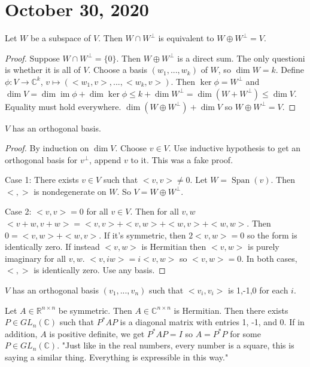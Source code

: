 \documentclass{article}
\newcommand{\C}{\mathbb{C}}
\newcommand{\R}{\mathbb{R}}
\newcommand{\ra}[1][]{\xrightarrow{#1}}
\DeclareMathOperator{\im}{im}
\DeclareMathOperator{\Span}{Span}
\begin{document}
\section{October 30, 2020}
\begin{theorem}
Let $W$ be a subspace of $V$. Then $W\cap W^\perp$ is equivalent to $W\oplus W^\perp=V$.
\end{theorem}
\begin{proof}
Suppose $W\cap W^\perp=\{0\}$. Then $W\oplus W^\perp$ is a direct sum. The only questioni is whether it is all of $V$. Choose a basis $(w_1,...,w_k)$ of $W$, so $\dim W=k$. Define $\phi:V\ra \C^k$, $v\mapsto (<w_1,v>,...,<w_k,v>)$. Then $\ker\phi=W^\perp$ and $\dim V=\dim\im\phi+\dim\ker\phi\leq k+\dim W^\perp =\dim (W+W^\perp)\leq \dim V$. Equality must hold everywhere. $\dim(W\oplus W^\perp)+\dim V$ so $W\oplus W^\perp=V$.
\end{proof}
\begin{theorem}
$V$ has an orthogonal basis.
\end{theorem}
\begin{proof}
By induction on $\dim V$. Choose $v\in V$. Use inductive hypothesis to get an orthogonal basis for $v^\perp$, append $v$ to it. This was a fake proof.

Case 1: There exists $v\in V$ such that $<v,v>\neq 0$. Let $W=\Span(v)$. Then $<,>$ is nondegenerate on $W$. So $V=W\oplus W^\perp$.

Case 2: $<v,v>=0$ for all $v\in V$. Then for all $v,w$ $<v+w,v+w>=<v,v>+<v,w>+<w,v>+<w,w>$. Then $0=<v,w>+<w,v>$. If it's symmetric, then $2<v,w>=0$ so the form is identically zero. If instead $<v,w>$ is Hermitian then $<v,w>$ is purely imaginary for all $v,w$. $<v,iw>=i<v,w>$ so $<v,w>=0$. In both cases, $<,>$ is identically zero. Use any basis.
\end{proof}
\begin{corollary}
$V$ has an orthogonal basis $(v_1,...,v_n)$ such that $<v_i,v_i>$ is 1,-1,0 for each $i$.
\end{corollary}
\begin{corollary}
Let $A\in \R^{n\times n}$ be symmetric. Then $A\in \C^{n\times n}$ is Hermitian. Then there exists $P\in GL_n(\C)$ such that $P^*AP$ is a diagonal matrix with entries 1, -1, and 0. If in addition, $A$ is positive definite, we get $P^*AP=I$ so $A=P^*P$ for some $P\in GL_n(\C)$. "Just like in the real numbers, every number is a square, this is saying a similar thing. Everything is expressible in this way."
\end{corollary}
\end{document}
